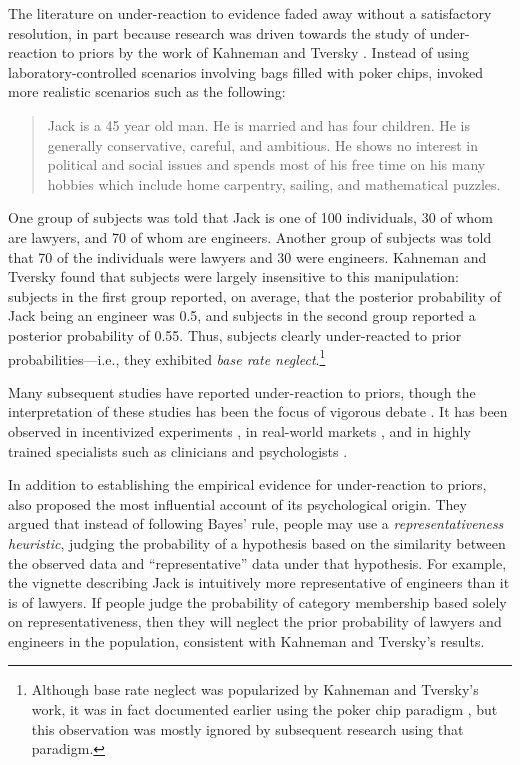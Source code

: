 The literature on under-reaction to evidence faded away without a satisfactory resolution, in part because research was driven towards the study of under-reaction to priors by the work of Kahneman and Tversky  \citep{kahneman1973psychology,kahneman1972subjective}. Instead of using laboratory-controlled scenarios involving bags filled with poker chips, \citet{kahneman1973psychology} invoked more realistic scenarios such as the following:
\begin{quote}
    Jack is a 45 year old man. He is married and has four children. He is generally conservative, careful, and ambitious. He shows no interest in political and social issues and spends most of his free time on his many hobbies which include home carpentry, sailing, and mathematical puzzles.
\end{quote}
One group of subjects was told that Jack is one of 100 individuals, 30 of whom are lawyers, and 70 of whom are engineers. Another group of subjects was told that 70 of the individuals were lawyers and 30 were engineers. Kahneman and Tversky found that subjects were largely insensitive to this manipulation: subjects in the first group reported, on average, that the posterior probability of Jack being an engineer was 0.5, and subjects in the second group reported a posterior probability of 0.55. Thus, subjects clearly under-reacted to prior probabilities---i.e., they exhibited \emph{base rate neglect}.\footnote{Although base rate neglect was popularized by Kahneman and Tversky's work, it was in fact documented earlier using the poker chip paradigm \citep{phillips1966conservatism}, but this observation was mostly ignored by subsequent research using that paradigm.}

Many subsequent studies have reported under-reaction to priors, though the interpretation of these studies has been the focus of vigorous debate \citep[see][]{koehler1996base,barbey2007base}. It has been observed in incentivized experiments \citep[e.g.,][]{grether1980bayes,ganguly2000asset}, in real-world markets \citep{barberis1998model}, and in highly trained specialists such as clinicians \citep{eddy1982probabilistic} and psychologists \citep{kennedy1997base}.

In addition to establishing the empirical evidence for under-reaction to priors, \citet{kahneman1972subjective} also proposed the most influential account of its psychological origin. They argued that instead of following Bayes' rule, people may use a \emph{representativeness heuristic}, judging the probability of a hypothesis based on the similarity between the observed data and ``representative'' data under that hypothesis. For example, the vignette describing Jack is intuitively more representative of engineers than it is of lawyers. If people judge the probability of category membership based solely on representativeness, then they will neglect the prior probability of lawyers and engineers in the population, consistent with Kahneman and Tversky's results.

